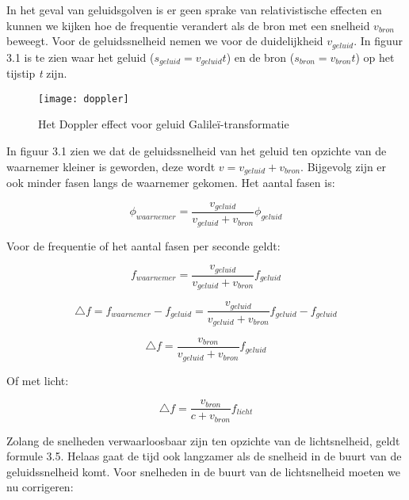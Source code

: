 In het geval van geluidsgolven is er geen sprake van relativistische
effecten en kunnen we kijken hoe de frequentie verandert als de bron
met een snelheid $v_{bron}$ beweegt. Voor de geluidssnelheid nemen
we voor de duidelijkheid $v_{geluid}$. In figuur 3.1 is te zien waar
het geluid ($s_{geluid}=v_{geluid}t$) en de bron ($s_{bron}=v_{bron}t$)
op het tijstip \emph{t} zijn.

\begin{figure}[h]
\noindent \begin{centering}
\texttt{[image: doppler]}
\par\end{centering}

\caption{Het Doppler effect voor geluid Galileï-transformatie}
\end{figure}


In figuur 3.1 zien we dat de geluidssnelheid van het geluid ten opzichte
van de waarnemer kleiner is geworden, deze wordt $v=v_{geluid}+v_{bron}$.
Bijgevolg zijn er ook minder fasen langs de waarnemer gekomen. Het
aantal fasen is:

\begin{equation}
\phi_{waarnemer}=\frac{v_{geluid}}{v_{geluid}+v_{bron}}\phi_{geluid}
\end{equation}


Voor de frequentie of het aantal fasen per seconde geldt:

\begin{equation}
f_{waarnemer}=\frac{v_{geluid}}{v_{geluid}+v_{bron}}f_{geluid}
\end{equation}


\begin{equation}
\triangle f=f_{waarnemer}-f_{geluid}
=\frac{v_{geluid}}{v_{geluid}+v_{bron}}f_{geluid}-f_{geluid}
\end{equation}


\begin{equation}
\triangle f=\frac{v_{bron}}{v_{geluid}+v_{bron}}f_{geluid}
\end{equation}


Of met licht:

\begin{equation}
\triangle f=\frac{v_{bron}}{c+v_{bron}}f_{licht}
\end{equation}


Zolang de snelheden verwaarloosbaar zijn ten opzichte van de lichtsnelheid,
geldt formule 3.5. Helaas gaat de tijd ook langzamer als de snelheid
in de buurt van de geluidssnelheid komt. Voor snelheden in de buurt
van de lichtsnelheid moeten we nu corrigeren:

